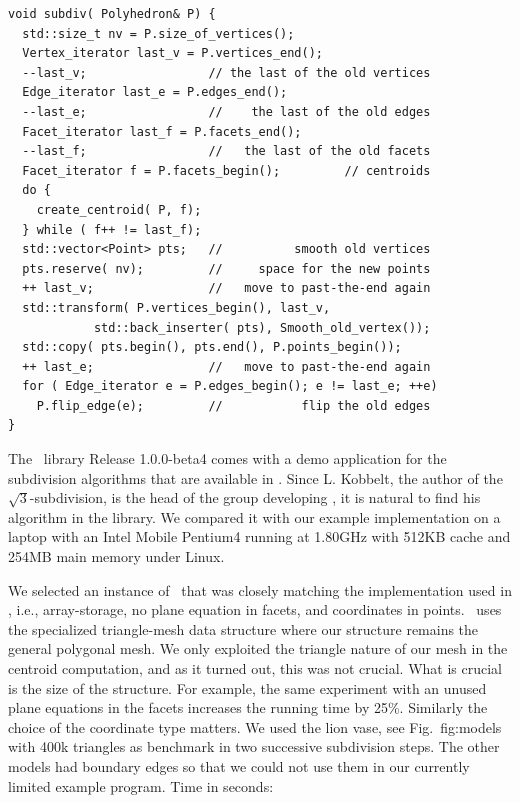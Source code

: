 \begin{lstlisting}
void subdiv( Polyhedron& P) {
  std::size_t nv = P.size_of_vertices();
  Vertex_iterator last_v = P.vertices_end();
  --last_v;                 // the last of the old vertices
  Edge_iterator last_e = P.edges_end();
  --last_e;                 //    the last of the old edges
  Facet_iterator last_f = P.facets_end();
  --last_f;                 //   the last of the old facets
  Facet_iterator f = P.facets_begin();         // centroids
  do {
    create_centroid( P, f);
  } while ( f++ != last_f);
  std::vector<Point> pts;   //          smooth old vertices
  pts.reserve( nv);         //     space for the new points
  ++ last_v;                //   move to past-the-end again
  std::transform( P.vertices_begin(), last_v, 
            std::back_inserter( pts), Smooth_old_vertex());
  std::copy( pts.begin(), pts.end(), P.points_begin());
  ++ last_e;                //   move to past-the-end again
  for ( Edge_iterator e = P.edges_begin(); e != last_e; ++e)
    P.flip_edge(e);         //           flip the old edges
}
\end{lstlisting}\vspace*{-3mm}

\noindent
The \openmesh\ library Release 1.0.0-beta4 comes with a demo
application for the subdivision algorithms that are available in
\openmesh. Since L.  Kobbelt, the author of the
$\sqrt{3}$-subdivision, is the head of the group developing \openmesh,
it is natural to find his algorithm in the library. We compared it
with our example implementation on a laptop with an Intel Mobile
Pentium4 running at 1.80GHz with 512KB cache and 254MB main memory
under Linux.

We selected an instance of \cgalpoly\ that was closely matching the
implementation used in \openmesh, i.e., array-storage, no plane
equation in facets, and  coordinates in
points. \openmesh\ uses the specialized triangle-mesh data structure
where our structure remains the general polygonal mesh. We only
exploited the triangle nature of our mesh in the centroid computation,
and as it turned out, this was not crucial.  What is crucial is the
size of the structure. For example, the same experiment with an unused
plane equations in the facets increases the running time by
25\%. Similarly the choice of the coordinate type matters. We used the
lion vase, see Fig.~{fig:models} with 400k triangles as benchmark in
two successive subdivision steps. The other models had boundary edges
so that we could not use them in our currently limited example
program. Time in seconds:

